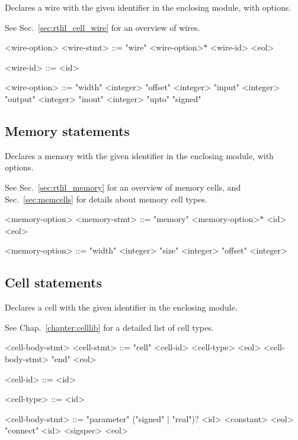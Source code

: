 Declares a wire with the given identifier in the enclosing module, with options.

See Sec.~\ref{sec:rtlil_cell_wire} for an overview of wires.

\begin{indentgrammar}{<wire-option>}
<wire-stmt> ::= "wire" <wire-option>$*$ <wire-id> <eol>

<wire-id> ::= <id>

<wire-option> ::= 
"width" <integer>
  \alt "offset" <integer>
  \alt "input" <integer>
  \alt "output" <integer>
  \alt "inout" <integer>
  \alt "upto"
  \alt "signed"
\end{indentgrammar}

\subsection{Memory statements}

Declares a memory with the given identifier in the enclosing module, with options.

See Sec.~\ref{sec:rtlil_memory} for an overview of memory cells, and Sec.~\ref{sec:memcells} for details about memory cell types.

\begin{indentgrammar}{<memory-option>}
<memory-stmt> ::= "memory" <memory-option>$*$ <id> <eol>

<memory-option> ::= 
"width" <integer>
  \alt "size" <integer>
  \alt "offset" <integer>
\end{indentgrammar}

\subsection{Cell statements}

Declares a cell with the given identifier in the enclosing module.

See Chap.~\ref{chapter:celllib} for a detailed list of cell types.

\begin{indentgrammar}{<cell-body-stmt>}
<cell-stmt> ::= "cell" <cell-id> <cell-type> <eol> <cell-body-stmt> "end" <eol>

<cell-id> ::= <id>

<cell-type> ::= <id>

<cell-body-stmt> ::= 
"parameter" ("signed" | "real")$?$ <id> <constant> <eol>
  \alt "connect" <id> <sigspec> <eol>
\end{indentgrammar}

